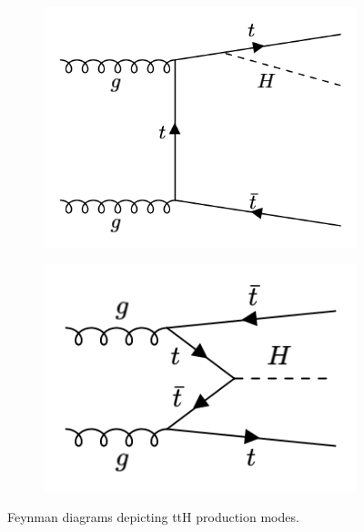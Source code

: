 \begin{figure}[htp]
\begin{subfigure}[b]{0.3\textwidth}
         \includegraphics[width=\textwidth]{figures/theory_chapter/ttH3.png}
         \label{fig:ttH3}
     \end{subfigure}
     \hfill
         \begin{subfigure}[b]{0.3\textwidth}
         \centering
         \includegraphics[width=\textwidth]{figures/theory_chapter/ttH4.png}
         \label{fig:ttH4}
     \end{subfigure}
     \hfill 
  \label{fig:loopmodes}
  \caption{Feynman diagrams depicting ttH production modes.}  
\end{figure}

